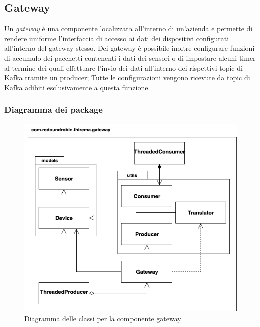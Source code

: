 \subsection{Gateway}
	Un \textit{gateway} è una componente localizzata all'interno di un'azienda e permette di rendere uniforme l'interfaccia di accesso ai dati dei dispositivi configurati all'interno del gateway stesso.
	Dei gateway è possibile inoltre configurare funzioni di accumulo dei pacchetti contenenti i dati dei sensori o di impostare alcuni timer al termine dei quali effettuare l'invio dei dati all'interno dei rispettivi topic di Kafka tramite un producer;
	Tutte le configurazioni vengono ricevute da topic di Kafka adibiti esclusivamente a questa funzione.
	
	\subsubsection{Diagramma dei package}%
	  	\begin{figure}[H]
			\centering
			\includegraphics[scale=0.550]{res/images/GATEWAY/GatewayPackage.png}
			\caption{Diagramma delle classi per la componente gateway}
		\end{figure}		

